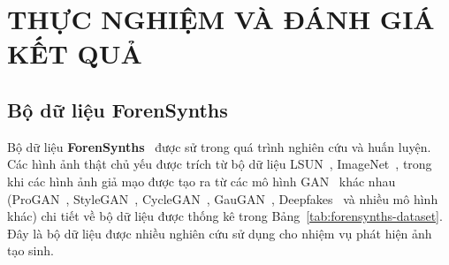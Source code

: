 \chapter{THỰC NGHIỆM VÀ ĐÁNH GIÁ KẾT QUẢ}
\label{Chapter4}
\section{Bộ dữ liệu ForenSynths}
Bộ dữ liệu \textbf{ForenSynths}~\cite{Wang2019CNNGeneratedIA} được sử trong quá trình nghiên cứu và huấn luyện. Các hình ảnh thật chủ yếu được trích từ bộ dữ liệu LSUN~\cite{Yu2015ConstructionOA}, ImageNet~\cite{5206848}, trong khi các hình ảnh giả mạo được tạo ra từ các mô hình GAN~\cite{Goodfellow2014GenerativeAN} khác nhau (ProGAN~\cite{karras2018progressive}, StyleGAN~\cite{karras2019style},  CycleGAN~\cite{zhu2017unpaired}, GauGAN~\cite{park2019SPADE}, Deepfakes~\cite{CaliforniaDeepfakes} và nhiều mô hình khác) chi tiết về bộ dữ liệu được thống kê trong Bảng~\ref{tab:forensynths-dataset}. Đây là bộ dữ liệu được nhiều nghiên cứu sử dụng cho nhiệm vụ phát hiện ảnh tạo sinh.
%
